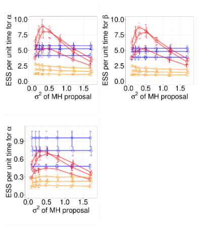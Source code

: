 {%
  \begin{figure}%
  \centering
  \begin{minipage}[hp]{0.65\linewidth}
  \centering
    \includegraphics [width=0.44\textwidth, angle=0]{figs/q_3_alpha.pdf}
    \includegraphics [width=0.44\textwidth, angle=0]{figs/q_3_beta.pdf}
  \centering
    \includegraphics [width=0.44\textwidth, angle=0]{figs/q_10_alpha.pdf}

\end{minipage}
\end{figure}}
